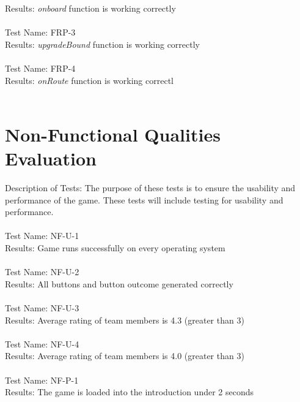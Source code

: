 \documentclass[12,english]{article}
\begin{document}
	Results: \textit{onboard} function is working correctly\\ \\
	
	Test Name: FRP-3\\
	
	Results: \textit{upgradeBound} function is working correctly\\ \\
	
	Test Name: FRP-4\\
	
	Results: \textit{onRoute} function is working correctl\\ \\


\section{Non-Functional Qualities Evaluation}
Description of Tests: The purpose of these tests is to ensure the usability and performance of the game. These tests will include testing for usability and performance. \\ \\

	Test Name: NF-U-1 \\
	
	Results: Game runs successfully on every operating system \\ \\
	
	Test Name: NF-U-2 \\
	
	Results: All buttons and button outcome generated correctly\\ \\
	
	Test Name: NF-U-3 \\
	
	Results: Average rating of team members is 4.3 (greater than 3) \\ \\
	
	Test Name: NF-U-4 \\
	
	Results: Average rating of team members is 4.0 (greater than 3) \\ \\

    Test Name: NF-P-1 \\
	
	Results: The game is loaded into the introduction under 2 seconds \\ \\
\end{document}
